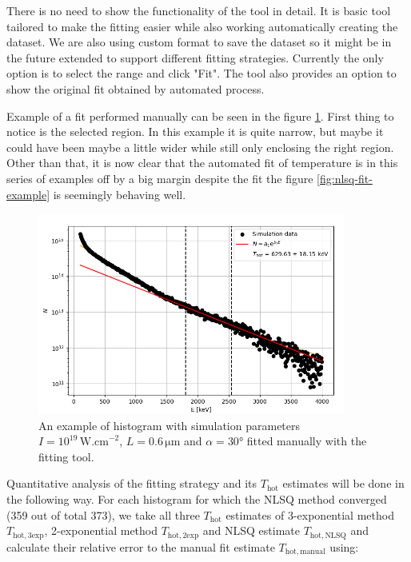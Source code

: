 There is no need to show the functionality of the tool in detail. It is basic tool tailored to make the fitting easier while also working automatically creating the dataset. We are also using custom format to save the dataset so it might be in the future extended to support different fitting strategies. Currently the only option is to select the range and click "Fit". The tool also provides an option to show the original fit obtained by automated process. 

Example of a fit performed manually can be seen in the figure \ref{fig:manual-fit-example}. First thing to notice is the selected region. In this example it is quite narrow, but maybe it could have been maybe a little wider while still only enclosing the right region. Other than that, it is now clear that the automated fit of temperature is in this series of examples off by a big margin despite the fit the figure \ref{fig:nlsq-fit-example} is seemingly behaving well.

\begin{figure}[t]
	\centering
	\includegraphics[width=0.9\textwidth]{figures/hist_1e19_060_30_manual}
	\caption{An example of histogram with simulation parameters $I=10^{19}\,\mathrm{W.cm}^{-2}$, $L=0.6\,\mathrm{\mu m}$ and $\alpha = 30$° fitted manually with the fitting tool.}
	\label{fig:manual-fit-example}
\end{figure}

Quantitative analysis of the fitting strategy and its $T_\mathrm{hot}$ estimates will be done in the following way. For each histogram for which the NLSQ method converged (359 out of total 373), we take all three $T_\mathrm{hot}$ estimates of 3-exponential method $T_\mathrm{hot,3exp}$, 2-exponential method $T_\mathrm{hot,2exp}$ and NLSQ estimate $T_\mathrm{hot,NLSQ}$ and calculate their relative error to the manual fit estimate $T_\mathrm{hot,manual}$ using:

